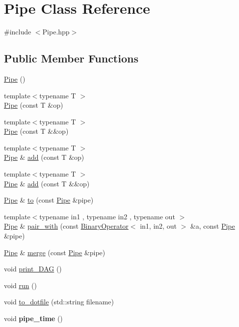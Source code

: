 \hypertarget{class_pipe}{\section{\-Pipe \-Class \-Reference}
\label{class_pipe}
}


{\ttfamily \#include $<$\-Pipe.\-hpp$>$}

\subsection*{\-Public \-Member \-Functions}
\begin{DoxyCompactItemize}
\item 
\hyperlink{class_pipe_a91ddad07e89d5585b1cf27fa7860e201}{\-Pipe} ()
\item 
{\footnotesize template$<$typename T $>$ }\\\hyperlink{class_pipe_a2112ea3ec975e32d471195d7d37dced9}{\-Pipe} (const \-T \&op)
\item 
{\footnotesize template$<$typename T $>$ }\\\hyperlink{class_pipe_ad634a48b656601f80db6fa413c47b035}{\-Pipe} (const \-T \&\&op)
\item 
{\footnotesize template$<$typename T $>$ }\\\hyperlink{class_pipe}{\-Pipe} \& \hyperlink{class_pipe_aa0577b9eaa033a89b6a76353764eed39}{add} (const \-T \&op)
\item 
{\footnotesize template$<$typename T $>$ }\\\hyperlink{class_pipe}{\-Pipe} \& \hyperlink{class_pipe_af0843b7b6b6c33606fce7a995450678a}{add} (const \-T \&\&op)
\item 
\hyperlink{class_pipe}{\-Pipe} \& \hyperlink{class_pipe_a1772082ed12c8b1df452a40439738138}{to} (const \hyperlink{class_pipe}{\-Pipe} \&pipe)
\item 
{\footnotesize template$<$typename in1 , typename in2 , typename out $>$ }\\\hyperlink{class_pipe}{\-Pipe} \& \hyperlink{class_pipe_a5ddf06055414d4ad0b511596dbf3a390}{pair\-\_\-with} (const \hyperlink{class_binary_operator}{\-Binary\-Operator}$<$ in1, in2, out $>$ \&a, const \hyperlink{class_pipe}{\-Pipe} \&pipe)
\item 
\hyperlink{class_pipe}{\-Pipe} \& \hyperlink{class_pipe_ac07aed5f6efda8248a8d3fe7410df6f2}{merge} (const \hyperlink{class_pipe}{\-Pipe} \&pipe)
\item 
void \hyperlink{class_pipe_a288d5b72778f836c7fbca280bf858976}{print\-\_\-\-D\-A\-G} ()
\item 
void \hyperlink{class_pipe_a6ecb3df1580730102c3e925875962bfd}{run} ()
\item 
void \hyperlink{class_pipe_a305c4d6db780c5e2d46a89f756d9aadf}{to\-\_\-dotfile} (std\-::string filename)
\item 
\hypertarget{class_pipe_a6e0bfcd983a9d63d681e1885c282143a}{void {\bfseries pipe\-\_\-time} ()}\label{class_pipe_a6e0bfcd983a9d63d681e1885c282143a}

\end{DoxyCompactItemize}


